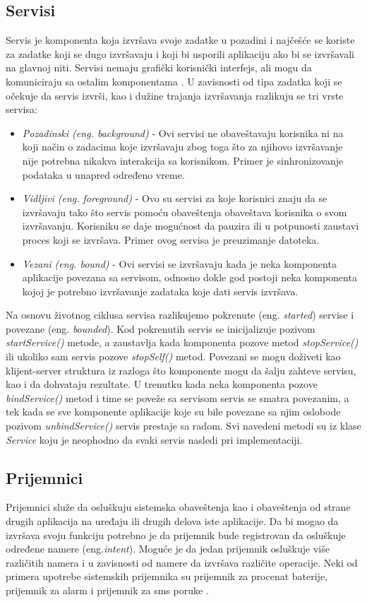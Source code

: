 \documentclass[android.tex]{subfiles}
\begin{document}
\subsection{Servisi}
Servis je komponenta koja izvršava svoje zadatke u pozadini i najčešće se koriste za zadatke koji se dugo izvršavaju i koji bi usporili aplikaciju ako bi se izvršavali na glavnoj niti. Servisi nemaju grafički korisnički interfejs, ali mogu da komuniciraju sa ostalim komponentama \cite{book:hellman}. U zavisnosti od tipa zadatka koji se očekuje da servis izvrši, kao i dužine trajanja izvršavanja razlikuju se tri vrste servisa:
\begin{itemize}
    \item \textit{Pozadinski (eng. background)} - Ovi servisi ne obaveštavaju korisnika ni na koji način o zadacima koje izvršavaju zbog toga što za njihovo izvršavanje nije potrebna nikakva interakcija sa korisnikom. Primer je sinhronizovanje podataka u unapred određeno vreme.  
    \item \textit{Vidljivi (eng. foreground)} - Ovo su servisi za koje korisnici znaju da se izvršavaju tako što servis pomoću obaveštenja obaveštava korisnika o svom izvršavanju. Korisniku se daje mogućnost da pauzira ili u potpunosti zaustavi proces koji se izvršava. Primer ovog servisa je preuzimanje datoteka.
    \item \textit{Vezani (eng. bound)} - Ovi servisi se izvršavaju kada je neka komponenta aplikacije povezana sa servisom, odnosno dokle god postoji neka komponenta kojoj je potrebno izvršavanje zadataka koje dati servis izvršava.
\end{itemize}

Na osnovu životnog ciklusa servisa razlikujemo pokrenute (eng. \textit{started}) servise i povezane (eng. \textit{bounded}). Kod pokrenutih servis se inicijalizuje pozivom \textit{startService() }metode, a zaustavlja kada komponenta pozove metod \textit{stopService() }ili ukoliko sam servis pozove\textit{ stopSelf() }metod. Povezani se mogu doživeti kao klijent-server struktura iz razloga što komponente mogu da šalju zahteve servisu, kao i da dohvataju rezultate. U trenutku kada neka komponenta pozove \textit{bindService()} metod i time se poveže sa servisom servis se smatra povezanim, a tek kada se sve komponente aplikacije koje su bile povezane sa njim oslobode pozivom \textit{unbindService() }servis prestaje sa radom. Svi navedeni metodi su iz klase \textit{Service} koju je neophodno da svaki servis nasledi pri implementaciji.


\subsection{Prijemnici}
Prijemnici služe da osluškuju sistemska obaveštenja kao i obaveštenja od strane drugih aplikacija na uređaju ili drugih delova iste aplikacije. Da bi mogao da izvršava svoju funkciju potrebno je da prijemnik bude registrovan da osluškuje određene namere (eng.\textit{intent}). Moguće je da jedan prijemnik osluškuje više različitih namera i u zavisnosti od namere da izvršava različite operacije. Neki od primera upotrebe sistemskih prijemnika su prijemnik za procenat baterije, prijemnik za alarm i prijemnik za sms poruke \cite{book:mzivkovic}. 
\end{document}
